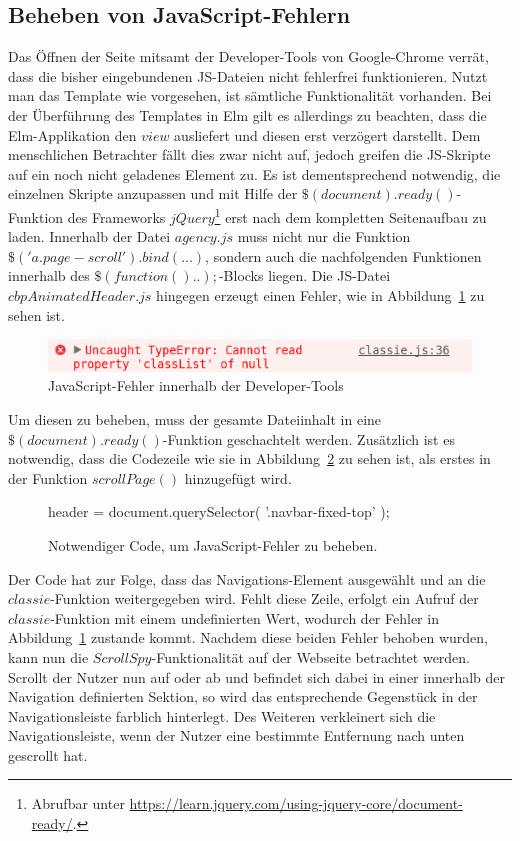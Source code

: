 \subsection{Beheben von JavaScript-Fehlern}
\label{sec:javascript-errors}
Das Öffnen der Seite mitsamt der Developer-Tools von Google-Chrome verrät, dass die bisher eingebundenen \ac{JS}-Dateien nicht fehlerfrei funktionieren. Nutzt man das Template wie vorgesehen, ist sämtliche Funktionalität vorhanden. Bei der Überführung des Templates in Elm gilt es allerdings zu beachten, dass die Elm-Applikation den $view$ ausliefert und diesen erst verzögert darstellt. Dem menschlichen Betrachter fällt dies zwar nicht auf, jedoch greifen die \ac{JS}-Skripte auf ein noch nicht geladenes Element zu. Es ist dementsprechend notwendig, die einzelnen Skripte anzupassen und mit Hilfe der $\$(document).ready()$-Funktion des Frameworks $jQuery$\footnote{Abrufbar unter \url{https://learn.jquery.com/using-jquery-core/document-ready/}.} erst nach dem kompletten Seitenaufbau zu laden.
Innerhalb der Datei $agency.js$ muss nicht nur die Funktion $\$('a.page-scroll').bind(...)$, sondern auch die nachfolgenden Funktionen innerhalb des $\$(function(){..});$-Blocks liegen. Die \ac{JS}-Datei $cbpAnimatedHeader.js$ hingegen erzeugt einen Fehler, wie in Abbildung~\ref{fig:js-classie-error} zu sehen ist.
\begin{figure}[h]
\centering
\includegraphics[scale=0.4]{img/error-javascript-classie.png}
\caption{JavaScript-Fehler innerhalb der Developer-Tools}\label{fig:js-classie-error}
\end{figure}
Um diesen zu beheben, muss der gesamte Dateiinhalt in eine $\$(document).ready()$-Funktion geschachtelt werden. Zusätzlich ist es notwendig, dass die Codezeile wie sie in Abbildung~\ref{fig:code-to-add} zu sehen ist, als erstes in der Funktion $scrollPage()$ hinzugefügt wird.
\begin{figure}[h]
\centering
header = document.querySelector( '.navbar-fixed-top' );
\caption{Notwendiger Code, um JavaScript-Fehler zu beheben.}\label{fig:code-to-add}
\end{figure}
Der Code hat zur Folge, dass das Navigations-Element ausgewählt und an die $classie$-Funktion weitergegeben wird. Fehlt diese Zeile, erfolgt ein Aufruf der $classie$-Funktion mit einem undefinierten Wert, wodurch der Fehler in Abbildung~\ref{fig:js-classie-error} zustande kommt. Nachdem diese beiden Fehler behoben wurden, kann nun die $ScrollSpy$-Funktionalität auf der Webseite betrachtet werden. Scrollt der Nutzer nun auf oder ab und befindet sich dabei in einer innerhalb der Navigation definierten Sektion, so wird das entsprechende Gegenstück in der Navigationsleiste farblich hinterlegt. Des Weiteren verkleinert sich die Navigationsleiste, wenn der Nutzer eine bestimmte Entfernung nach unten gescrollt hat.


